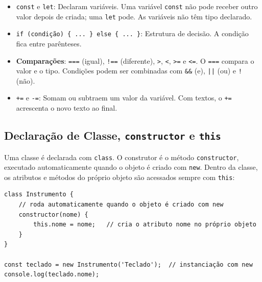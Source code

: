 \begin{itemize}
    \item \texttt{const} e \texttt{let}: Declaram variáveis. Uma variável \texttt{const} não pode
    receber outro valor depois de criada; uma \texttt{let} pode. As variáveis não têm tipo
    declarado.

    \item \texttt{if (condição) \{ ... \} else \{ ... \}}: Estrutura de decisão. A condição fica
    entre parênteses.

    \item \textbf{Comparações}: \texttt{===} (igual), \texttt{!==} (diferente), \texttt{>},
    \texttt{<}, \texttt{>=} e \texttt{<=}. O \texttt{===} compara o valor e o tipo. Condições
    podem ser combinadas com \texttt{\&\&} (e), \texttt{||} (ou) e \texttt{!} (não).

    \item \texttt{+=} e \texttt{-=}: Somam ou subtraem um valor da variável. Com textos, o
    \texttt{+=} acrescenta o novo texto ao final.
\end{itemize}

\subsection{Declaração de Classe, \texttt{constructor} e \texttt{this}}

Uma classe é declarada com \texttt{class}. O construtor é o método \texttt{constructor},
executado automaticamente quando o objeto é criado com \texttt{new}. Dentro da classe, os
atributos e métodos do próprio objeto são acessados sempre com \texttt{this}:

\begin{lstlisting}[style=javascript]
class Instrumento {
    // roda automaticamente quando o objeto é criado com new
    constructor(nome) {
        this.nome = nome;   // cria o atributo nome no próprio objeto
    }
}

const teclado = new Instrumento('Teclado');  // instanciação com new
console.log(teclado.nome);
\end{lstlisting}

